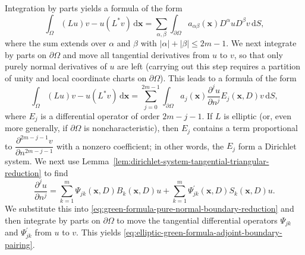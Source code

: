 \begin{Proof}
Integration by parts yields a formula of the form
\begin{equation}\label{eq:green-formula-raw-boundary-derivative-sum}
\int_\Omega(Lu)v-u(L^*v)\,\mathrm{d}\bm{x}=\sum_{\alpha,\beta}\int_{\partial\Omega}a_{\alpha\beta}(\bm{x})D^\alpha uD^\beta v\,\mathrm{d}S,
\end{equation}
where the sum extends over $\alpha$ and $\beta$ with $|\alpha|+|\beta|\leq2m-1$. We next integrate by parts on $\partial\Omega$ and move all tangential derivatives from $u$ to $v$, so that only purely normal derivatives of $u$ are left (carrying out this step requires a partition of unity and local coordinate charts on $\partial\Omega$). This leads to a formula of the form
\begin{equation}\label{eq:green-formula-pure-normal-boundary-reduction}
\int_\Omega(Lu)v-u(L^*v)\,\mathrm{d}\bm{x}=\sum_{j=0}^{2m-1}\int_{\partial\Omega}a_j(\bm{x})\frac{\partial^ju}{\partial n^j}E_j(\bm{x},D)v\,\mathrm{d}S,
\end{equation}
where $E_j$ is a differential operator of order $2m-j-1$. If $L$ is elliptic (or, even more generally, if $\partial\Omega$ is noncharacteristic), then $E_j$ contains a term proportional to $\dfrac{\partial^{2m-j-1}v}{\partial n^{2m-j-1}}$ with a nonzero coefficient; in other words, the $E_j$ form a Dirichlet system. We next use Lemma~\ref{lem:dirichlet-system-tangential-triangular-reduction} to find
\begin{equation}\label{eq:green-formula-normal-derivative-dirichlet-system-expansion}
\frac{\partial^ju}{\partial n^j}=\sum_{k=1}^m\Psi_{jk}(\bm{x},D)B_k(\bm{x},D)u+\sum_{k=1}^m\Psi_{jk}^{\prime}(\bm{x},D)S_k(\bm{x},D)u.
\end{equation}
We substitute this into \eqref{eq:green-formula-pure-normal-boundary-reduction} and then integrate by parts on $\partial\Omega$ to move the tangential differential operators $\Psi_{jk}$ and $\Psi_{jk}^{\prime}$ from $u$ to $v$. This yields \eqref{eq:elliptic-green-formula-adjoint-boundary-pairing}.


\end{Proof}
